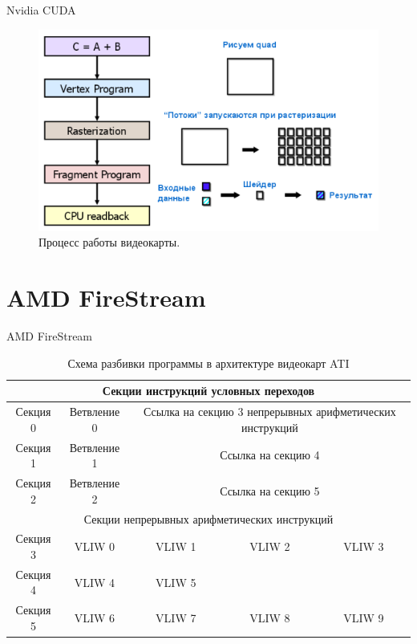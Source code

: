 \documentclass{beamer}
\begin{document}
\begin{frame}{Nvidia CUDA}

\begin{figure}
\center
\includegraphics[width=\textwidth]{Images/pipeline2.png}
\caption{\label{fig:pipeline}Процесс работы видеокарты.}
\end{figure}

\end{frame}

\section{AMD FireStream}

\begin{frame}{AMD FireStream}

\begin{table}
\begin{center}
\begin{tabular}{|c|c|c|c|c|}
\hline
\multicolumn{5}{|c|}{Секции инструкций условных переходов} \\
\hline
Секция 0 & Ветвление 0 & \multicolumn{3}{|p{6cm}|}{Ссылка на секцию 3 непрерывных арифметических инструкций} \\ \hline
Секция 1 & Ветвление 1 & \multicolumn{3}{|p{6cm}|}{Ссылка на секцию 4} \\ \hline
Секция 2 & Ветвление 2 & \multicolumn{3}{|p{6cm}|}{Ссылка на секцию 5} \\ \hline
\multicolumn{5}{|c|}{Секции непрерывных арифметических инструкций} \\ \hline
Секция 3 & VLIW 0 & VLIW 1 & VLIW 2 & VLIW 3 \\ \hline
Секция 4 & VLIW 4 & VLIW 5 & & \\ \hline
Секция 5 & VLIW 6 & VLIW 7 & VLIW 8 & VLIW 9 \\ \hline
\end{tabular}
\end{center}
\caption {Схема разбивки программы в архитектуре видеокарт ATI}
\end{table}

\end{frame}
\end{document}
